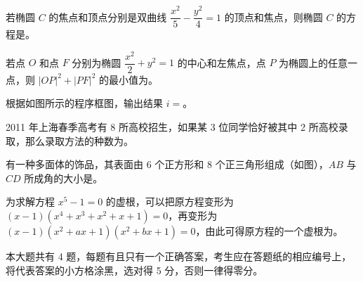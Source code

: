 \begin{question}
若椭圆 $C$ 的焦点和顶点分别是双曲线 $\dfrac{x^2}{5}-\dfrac{y^2}{4}=1$ 的顶点和焦点，则椭圆 $C$ 的方程是\gkblank{}。

\end{question}
\begin{question}
若点 $O$ 和点 $F$ 分别为椭圆 $\dfrac{x^2}{2}+y^2=1$ 的中心和左焦点，点 $P$ 为椭圆上的任意一点，则 $|OP|^2+|PF|^2$ 的最小值为\gkblank{}。

\Needspace{0.4\textheight}
\end{question}
\begin{question}
根据如图所示的程序框图，输出结果 $i=$\gkblank{}。
\nopagebreak[4]
\begin{center}\end{center}
\nopagebreak[4]
\end{question}
\begin{question}
2011 年上海春季高考有 8 所高校招生，如果某 3 位同学恰好被其中 2 所高校录取，那么录取方法的种数为\gkblank{}。

\Needspace{0.4\textheight}
\end{question}
\begin{question}
有一种多面体的饰品，其表面由 6 个正方形和 8 个正三角形组成（如图），$AB$ 与 $CD$ 所成角的大小是\gkblank{}。
\nopagebreak[4]
\begin{center}\end{center}
\nopagebreak[4]
\end{question}
\begin{question}
为求解方程 $x^5-1=0$ 的虚根，可以把原方程变形为 $(x-1)(x^4+x^3+x^2+x+1)=0$，再变形为 $(x-1)(x^2+ax+1)(x^2+bx+1)=0$，由此可得原方程的一个虚根为\gkblank{}。

\end{question}

本大题共有 4 题，每题有且只有一个正确答案，考生应在答题纸的相应编号上，将代表答案的小方格涂黑，选对得 5 分，否则一律得零分。

